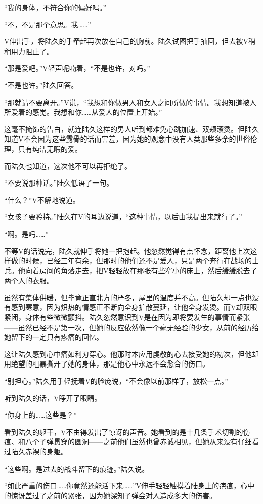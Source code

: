 “我的身体，不符合你的偏好吗。” 

“不，不是那个意思。我……”

V伸出手，将陆久的手牵起再次放在自己的胸前。陆久试图把手抽回，但去被V稍稍用力阻止了。

“那是爱吧。”V轻声呢喃着，“不是也许，对吗。”

“不是也许。”陆久回答。

“那就请不要离开。”V说，“我想和你做男人和女人之间所做的事情。我想知道被人所爱着的感觉。我想和你……从爱人的位置上开始。”

这毫不掩饰的告白，就连陆久这样的男人听到都难免心跳加速、双颊滚烫。但陆久知道V不会因为这些露骨的话而害羞，因为她的观念中没有人类那些多余的世俗伦理，只有纯洁无暇的爱。

而陆久也知道，这次他不可以再拒绝了。

“不要说那种话。”陆久低语了一句。

“什么？”V不解地说道。

“女孩子要矜持。”陆久在V的耳边说道，“这种事情，以后由我提出来就行了。”

“啊。是吗……”

不等V的话说完，陆久就伸手将她一把抱起。他忽然觉得有点怀念，距离他上次这样做的时候，已经三年有余，但那时的他们还不是爱人，只是两个奔行在战场的士兵。他向着房间的角落走去，把V轻轻放在那张有些窄小的床上，然后缓缓脱去了两个人的衣服。

虽然有集体供暖，但毕竟正直北方的严冬，屋里的温度并不高。但陆久却一点也没有感到寒意，因为炽热的情感正不断向全身扩散蔓延，让他全身发烫。而V却双眼紧闭，身体有些微微颤抖。陆久忽然意识到V是在因为即将要发生的事情而紧张——虽然已经不是第一次，但她的反应依然像一个毫无经验的少女，从前的经历给她留下的一定只有疼痛的回忆。

这让陆久感到心中痛如利刃穿心。他那时本应用虔敬的心去接受她的初次，但他却用绝望的粗暴撕开了她的身体，那是他心中永远不会愈合的伤口。

“别担心。”陆久用手轻抚着V的脸庞说，“不会像以前那样了，放松一点。”

听到陆久的话，V睁开了眼睛。

“你身上的……这些是？”

看到陆久的躯干，V不由得发出了惊讶的声音。她看到的是十几条手术切割的伤痕、和八个子弹贯穿的圆洞——之前他们虽然也曾赤诚相见，但她从来没有仔细看过陆久赤裸的身躯。

“这些啊。是过去的战斗留下的痕迹。”陆久说。

“如此严重的伤口……你竟然还能活下来……”V伸手轻轻触摸着陆身上的疤痕，心中的惊讶盖过了之前的紧张，因为她深知子弹会对人造成多大的伤害。

